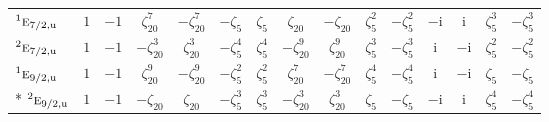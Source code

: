 \documentclass[10pt,a4paper]{article}
\numberwithin{equation}{section}
\newcommand{\irr}[1]{\text{\normalfont\scshape #1}}
\newcommand{\conjpair}[1]{{}^{#1}}
\newcommand{\ptag}[1]{\mathrm{#1}}
\newcommand{\iunit}{\mathrm{i}}
\newcommand{\rootunity}[1]{\zeta_{#1}}
\begin{document}
{\begin{longtable}{@{}lcccccccccccccc@{}}
$\conjpair{1}\irr{e}_{7/2,\ptag{u}}$ & $1$ & $-1$ & $\rootunity{20}^{7}$ & $-\rootunity{20}^{7}$ & $-\rootunity{5}$ & $\rootunity{5}$ & $\rootunity{20}$ & $-\rootunity{20}$ & $\rootunity{5}^{2}$ & $-\rootunity{5}^{2}$ & $-\iunit{}$ & $\iunit{}$ & $\rootunity{5}^{3}$ & $-\rootunity{5}^{3}$\\
$\conjpair{2}\irr{e}_{7/2,\ptag{u}}$ & $1$ & $-1$ & $-\rootunity{20}^{3}$ & $\rootunity{20}^{3}$ & $-\rootunity{5}^{4}$ & $\rootunity{5}^{4}$ & $-\rootunity{20}^{9}$ & $\rootunity{20}^{9}$ & $\rootunity{5}^{3}$ & $-\rootunity{5}^{3}$ & $\iunit{}$ & $-\iunit{}$ & $\rootunity{5}^{2}$ & $-\rootunity{5}^{2}$\\
$\conjpair{1}\irr{e}_{9/2,\ptag{u}}$ & $1$ & $-1$ & $\rootunity{20}^{9}$ & $-\rootunity{20}^{9}$ & $-\rootunity{5}^{2}$ & $\rootunity{5}^{2}$ & $\rootunity{20}^{7}$ & $-\rootunity{20}^{7}$ & $\rootunity{5}^{4}$ & $-\rootunity{5}^{4}$ & $\iunit{}$ & $-\iunit{}$ & $\rootunity{5}$ & $-\rootunity{5}$\\*
$\conjpair{2}\irr{e}_{9/2,\ptag{u}}$ & $1$ & $-1$ & $-\rootunity{20}$ & $\rootunity{20}$ & $-\rootunity{5}^{3}$ & $\rootunity{5}^{3}$ & $-\rootunity{20}^{3}$ & $\rootunity{20}^{3}$ & $\rootunity{5}$ & $-\rootunity{5}$ & $-\iunit{}$ & $\iunit{}$ & $\rootunity{5}^{4}$ & $-\rootunity{5}^{4}$\\
\bottomrule\end{longtable}}
\end{document}
